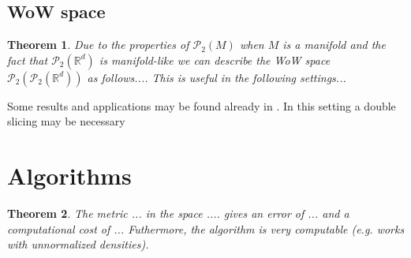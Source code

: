 \documentclass[
    a4paper,
    DIV=14,
    abstract=true,
    numbers=noenddot
]
{scrartcl}
\newtheorem{theorem}{Theorem}[section]
\theoremstyle{definition}
\newcommand{\R}{\mathbb{R}}
\newcommand{\Pp}{\mathcal{P}}
\begin{document}
\subsection{WoW space}
\begin{theorem}
Due to the properties of $\Pp_2(M)$ when $M$ is a manifold and the fact that $\Pp_2(\R^d)$ is manifold-like we can describe the WoW space $\Pp_2(\Pp_2(\R^d))$ as follows.... This is useful in the following settings...
\end{theorem}
Some results and applications may be found already in \cite{bonet2025flowing}.
In this setting a double slicing may be necessary \cite{piening2025slicing}

\section{Algorithms}
\begin{theorem}
The metric ... in the space .... gives an error of ... and a computational cost of ... Futhermore, the algorithm is very computable (e.g. works with unnormalized densities).
\end{theorem}
\end{document}
